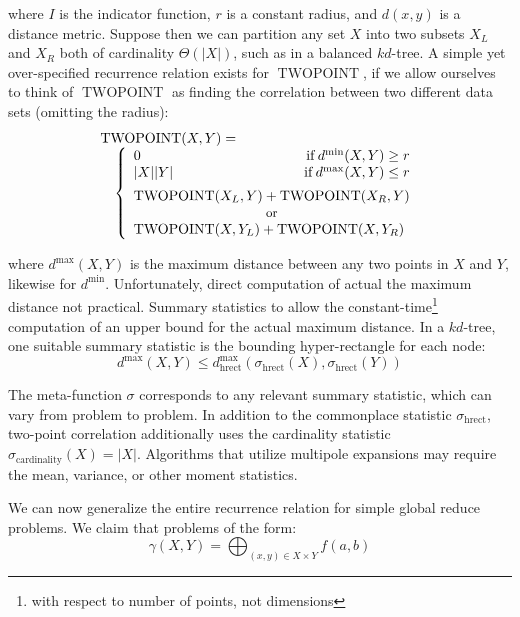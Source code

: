 \documentclass[times, 10pt,twocolumn]{article}
\DeclareMathOperator{\TWOPT}{TWOPOINT}
\DeclareMathOperator{\cardinality}{cardinality}
\DeclareMathOperator{\hrect}{hrect}
\DeclareMathOperator{\IF}{if}
\begin{document}
\noindent where $I$ is the indicator function, $r$ is a constant radius, and $d(x, y)$ is a distance metric.
Suppose then we can partition any set $X$ into two subsets $X_L$ and $X_R$ both of cardinality $\Theta(|X|)$, such as in a balanced $kd$-tree.
A simple yet over-specified recurrence relation exists for $\TWOPT$, if we allow ourselves to think of $\TWOPT$ as finding the correlation between two different data sets (omitting the radius):
\begin{equation}
 \begin{array}{ll}
  \lefteqn{\TWOPT(X, Y) =}
  \\
  & \left\{
    \begin{array}{lr}
      0 & \IF d^{\min}(X, Y) \geq r
      \\
      |X||Y| & \IF d^{\max}(X, Y) \leq r
      \vspace{0.07in}
      \\
      \multicolumn{2}{l}{\TWOPT(X_L, Y) + \TWOPT(X_R, Y)}
      \\
      \multicolumn{2}{c}{\scriptstyle{\mbox{\small{or}}}}
      \\
      \multicolumn{2}{l}{\TWOPT(X, Y_L) + \TWOPT(X, Y_R)}
    \end{array}
  \right.
 \end{array}
\end{equation}

\noindent where $d^{\max}(X, Y)$ is the maximum distance between any two points in $X$ and $Y$, likewise for $d^{\min}$.
Unfortunately, direct computation of actual the maximum distance not practical.
Summary statistics to allow the constant-time\footnote{with respect to number of points, not dimensions} computation of an upper bound for the actual maximum distance.
In a $kd$-tree, one suitable summary statistic is the bounding hyper-rectangle for each node:
\begin{equation}
d^{\max}(X, Y) \leq d^{\max}_{\hrect}(\sigma_{\hrect}(X), \sigma_{\hrect}(Y))
\end{equation}

\noindent The meta-function $\sigma$ corresponds to any relevant summary statistic, which can vary from problem to problem.
In addition to the commonplace statistic $\sigma_{\hrect}$, two-point correlation additionally uses the cardinality statistic $\sigma_{\cardinality}(X) = |X|$.
Algorithms that utilize multipole expansions may require the mean, variance, or other moment statistics.

We can now generalize the entire recurrence relation for simple global reduce problems.
We claim that problems of the form:
\begin{equation}
  \gamma(X, Y) = \bigoplus_{(x, y) \in X \times Y} f(a,b)
\end{equation}
\end{document}
